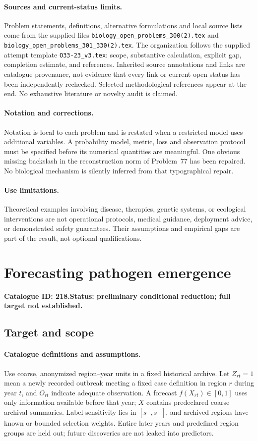 \documentclass[11pt]{article}
\begin{document}
\paragraph{Sources and current-status limits.}
Problem statements, definitions, alternative formulations and local source lists
come from the supplied files
\texttt{biology\_open\_problems\_300(2).tex} and
\texttt{biology\_open\_problems\_301\_330(2).tex}.
The organization follows the supplied attempt template
\texttt{O33-23\_v3.tex}: scope, substantive calculation, explicit gap,
completion estimate, and references. Inherited source annotations and links are
catalogue provenance, not evidence that every link or current open status has
been independently rechecked. Selected methodological references appear at the
end. No exhaustive literature or novelty audit is claimed.

\paragraph{Notation and corrections.}
Notation is local to each problem and is restated when a restricted model uses
additional variables. A probability model, metric, loss and observation protocol
must be specified before its numerical quantities are meaningful. One obvious
missing backslash in the reconstruction norm of Problem~77 has been repaired.
No biological mechanism is silently inferred from that typographical repair.

\paragraph{Use limitations.}
Theoretical examples involving disease, therapies, genetic systems, or ecological
interventions are not operational protocols, medical guidance, deployment advice,
or demonstrated safety guarantees. Their assumptions and empirical gaps are part
of the result, not optional qualifications.

\setcounter{section}{217}
\section{Forecasting pathogen emergence}
\label{prob:218}
\noindent\textbf{Catalogue ID: 218.}\quad \textbf{Status: preliminary conditional reduction; full target not established.}
\subsection{Target and scope}
\paragraph{Catalogue definitions and assumptions.}
Use coarse, anonymized region--year units in a fixed historical archive. Let $Z_{rt}=1$ mean a newly recorded outbreak meeting a fixed case definition in region $r$ during year $t$, and $O_{rt}$ indicate adequate observation. A forecast $f(X_{rt})\in[0,1]$ uses only information available before that year; $X$ contains predeclared coarse archival summaries. Label sensitivity lies in $[s_-,s_+]$, and archived regions have known or bounded selection weights. Entire later years and predefined region groups are held out; future discoveries are not leaked into predictors.
\end{document}
